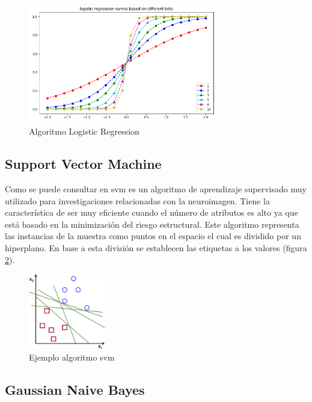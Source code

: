 \begin{figure}[H]
\centering
\includegraphics[width=0.74\textwidth]{figs/algorimos/log.png}
\caption{Algoritmo Logistic Regression \cite{MachineHEURISTICS}}
\label{figure:alglog}
\end{figure}

\subsection{Support Vector Machine}

Como se puede consultar en \cite{Brown2016MachineMRI} \gls{svm} es un algoritmo de aprendizaje supervisado muy utilizado para investigaciones relacionadas con la neuroimagen. Tiene la característica de ser muy eficiente cuando el número de atributos es alto ya que está basado en la minimización del riesgo estructural. Este algoritmo representa las instancias de la muestra como puntos en el espacio el cual es dividido por un hiperplano. En base a esta división se establecen las etiquetas a los valores (figura \ref{figure:algsvm}).

\begin{figure}[H]
\centering
\includegraphics[width=0.3\textwidth]{figs/algorimos/svm.png}
\caption{Ejemplo algoritmo \gls{svm} \cite{IntroductionDocumentation}}
\label{figure:algsvm}
\end{figure}

\subsection{Gaussian Naive Bayes}


